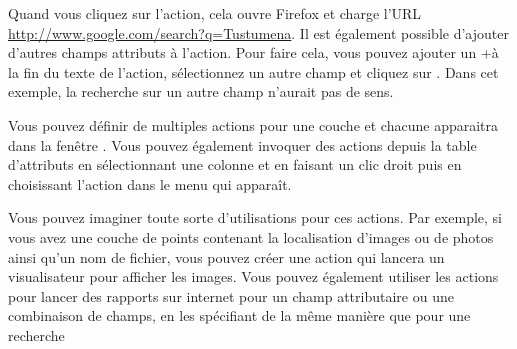 Quand vous cliquez sur l'action, cela ouvre Firefox et charge l'URL \url{http://www.google.com/search?q=Tustumena}. Il est également possible d'ajouter d'autres champs attributs à l'action. Pour faire cela, vous pouvez ajouter un \og +\fg à la fin du texte de l'action, sélectionnez un autre champ et cliquez sur . Dans cet exemple, la recherche sur un autre champ n'aurait pas de sens.

Vous pouvez définir de multiples actions pour une couche et chacune apparaitra dans la fenêtre . Vous pouvez également invoquer des actions depuis la table d'attributs en sélectionnant une colonne et en faisant un clic droit puis en choisissant l'action dans le menu qui apparaît.

Vous pouvez imaginer toute sorte d'utilisations pour ces actions. Par exemple, si vous avez une couche de points contenant la localisation d'images ou de photos ainsi qu'un nom de fichier, vous pouvez créer une action qui lancera un visualisateur pour afficher les images. Vous pouvez également utiliser les actions pour lancer des rapports sur internet pour un champ attributaire ou une combinaison de champs, en les spécifiant de la même manière que pour une recherche

